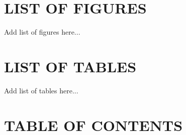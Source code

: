 \documentclass[a4paper, 12pt]{report}
\begin{document}
  


  
  
  
  
  

  \clearpage
  \renewcommand{\listfigurename}{}
  \section*{\centering \large LIST OF FIGURES}
  \vspace{-3.5em}
  \listoffigures
  Add list of figures here...  %
  \newpage

  \clearpage
  \renewcommand{\listtablename}{}
  \section*{\centering \large LIST OF TABLES}
  \vspace{-3.5em}
  \listoftables
  Add list of tables here...  %
  \newpage

  \clearpage
  \renewcommand{\contentsname}{}
  \section*{\centering \large TABLE OF CONTENTS}
  \vspace{-4.3em}
  \tableofcontents
  \newpage


  
  
  
  
  
  

  \justifying
\end{document}
